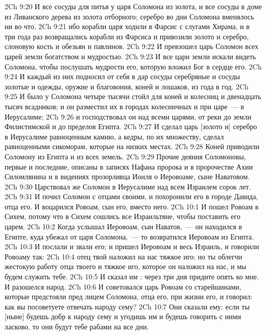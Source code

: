\vs 2Ch 9:20 И все сосуды для питья у царя Соломона  из золота, и все сосуды в доме из Ливанского дерева  из золота отборного; серебро во дни Соломона вменялось ни во что,
\vs 2Ch 9:21 ибо корабли царя ходили в Фарсис с слугами Хирама, и в три года раз возвращались корабли из Фарсиса и привозили золото и серебро, слоновую кость и обезьян и павлинов.
\rsbpar\vs 2Ch 9:22 И превзошел царь Соломон всех царей земли богатством и мудростью.
\vs 2Ch 9:23 И все цари земли искали видеть Соломона, чтобы послушать мудрости его, которую вложил Бог в сердце его.
\vs 2Ch 9:24 И каждый из них подносил от себя в дар сосуды серебряные и сосуды золотые и одежды, оружие и благовония, коней и лошаков, из года в год.
\vs 2Ch 9:25 И было у Соломона четыре тысячи стойл для коней и колесниц и двенадцать тысяч всадников; и он разместил их в городах колесничных и при царе~--- в Иерусалиме;
\vs 2Ch 9:26 и господствовал он над всеми царями, от реки  до земли Филистимской и до пределов Египта.
\vs 2Ch 9:27 И сделал царь [золото и] серебро в Иерусалиме равноценным  камню, а кедры, по их множеству, сделал равноценными сикоморам, которые на низких местах.
\vs 2Ch 9:28 Коней приводили Соломону из Египта и из всех земель.
\rsbpar\vs 2Ch 9:29 Прочие деяния Соломоновы, первые и последние, описаны в записях Нафана пророка и в пророчестве Ахии Силомлянина и в видениях прозорливца Иоиля о Иеровоаме, сыне Наватовом.
\vs 2Ch 9:30 Царствовал же Соломон в Иерусалиме над всем Израилем сорок лет.
\vs 2Ch 9:31 И почил Соломон с отцами своими, и похоронили его в городе Давида, отца его. И воцарился Ровоам, сын его, вместо него.
\vs 2Ch 10:1 И пошел Ровоам в Сихем, потому что в Сихем сошлись все Израильтяне, чтобы поставить его царем.
\vs 2Ch 10:2 Когда услышал  Иеровоам, сын Наватов,~--- он находился в Египте, куда убежал от царя Соломона,~--- то возвратился Иеровоам из Египта.
\vs 2Ch 10:3 И послали и звали его; и пришел Иеровоам и весь Израиль, и говорили Ровоаму так:
\vs 2Ch 10:4 отец твой наложил на нас тяжкое иго; но ты облегчи жестокую работу отца твоего и тяжкое иго, которое он наложил на нас, и мы будем служить тебе.
\vs 2Ch 10:5 И сказал им : через три дня придите опять ко мне. И разошелся народ.
\vs 2Ch 10:6 И советовался царь Ровоам со старейшинами, которые предстояли пред лицем Соломона, отца его, при жизни его, и говорил: как вы посоветуете отвечать народу сему?
\vs 2Ch 10:7 Они сказали ему: если ты [ныне] будешь добр к народу сему и угодишь им и будешь говорить с ними ласково, то они будут тебе рабами на все дни.
